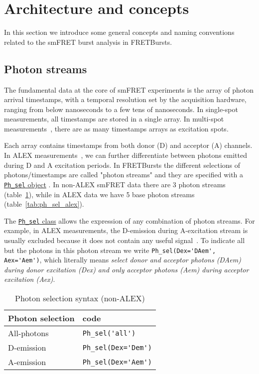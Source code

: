 \section{Architecture and concepts}
\label{sec:concepts}

In this section we introduce some general concepts and naming conventions related 
to the smFRET burst analysis in FRETBursts.

\subsection{Photon streams}
\label{sec:ph_streams}

The fundamental data at the core of smFRET experiments is the array of photon
arrival timestamps, with a temporal resolution set by the acquisition hardware,
ranging from below nanoseconds to a few tens of nanoseconds.
In single-spot
measurements, all timestamps are stored in a single array. In multi-spot
measurements~\cite{Ingargiola_2013}, there are as many timestamps arrays 
as excitation spots.

Each array contains timestamps from both donor (D) and acceptor (A) channels. 
In ALEX measurements~\cite{Lee_2005}, we can further differentiate between
photons emitted during D and A excitation periods. In FRETBursts the different
selections of photons/timestamps are called "photon streams" and they are
specified with a
\href{http://fretbursts.readthedocs.org/en/latest/ph_sel.html}{\texttt{Ph\_sel}
object} . In non-ALEX smFRET data there are 3 photon streams
(table~\ref{tab:ph_sel_smfret}), while in ALEX data we have 5 base photon
streams (table~\ref{tab:ph_sel_alex}).

The
\href{http://fretbursts.readthedocs.org/en/latest/ph_sel.html}{\texttt{Ph\_sel}
class} allows the expression of any combination of photon streams. 
For example, in ALEX measurements, the D-emission during A-excitation stream is
usually excluded because it does not contain any useful signal~\cite{Lee_2005}.
To indicate all but the photons in this photon stream we write
\verb|Ph_sel(Dex='DAem', Aex='Aem')|, which literally means \textit{select donor
and acceptor photons (DAem) during donor excitation (Dex) and only acceptor
photons (Aem) during acceptor excitation (Aex)}.

\begin{table}
\begin{tabular}{l|l}
  Photon selection  & code \\
  \hline
  All-photons       & \verb|Ph_sel('all')|\\
  D-emission    & \verb|Ph_sel(Dex='Dem')|\\
  A-emission & \verb|Ph_sel(Dex='Aem')|\\
\end{tabular}
\caption{\label{tab:ph_sel_smfret}Photon selection syntax (non-ALEX)}
\end{table}

